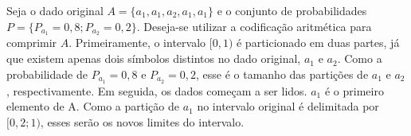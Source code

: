 %    


Seja o dado original $A = \{a_1, a_1, a_2, a_1, a_1\}$ e o conjunto de
probabilidades $P = \{P_{a_1} = 0,8; P_{a_2} = 0,2\}$. Deseja-se utilizar a
codificação aritmética para comprimir $A$. Primeiramente, o intervalo $[0, 1)$
é particionado em duas partes, já que existem apenas dois símbolos distintos no
dado original, $a_1$ e $a_2$. Como a probabilidade de $P_{a_1} = 0,8$ e
$P_{a_2} = 0,2$, esse é o tamanho das partições de $a_1$ e $a_2$,
respectivamente. Em seguida, os dados começam a ser lidos. $a_1$ é o primeiro
elemento de A. Como a partição de $a_1$ no intervalo original é delimitada por
$[0,2; 1)$, esses serão os novos limites do intervalo.

